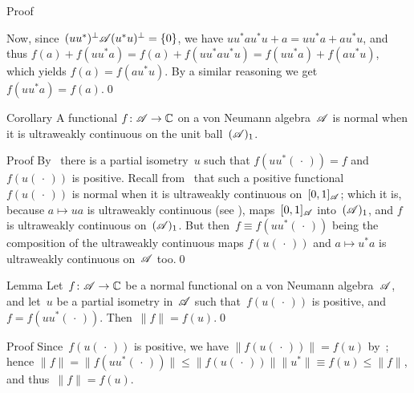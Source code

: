 \documentclass[a]{subfiles}
\begin{document}
\begin{parsec}
\begin{point}
\begin{point}{Proof}
\begin{point}
Now, since~$(uu^*)^\perp\mathscr{A}(u^*u)^\perp = \{0\}$,
we have $uu^* a u^*u + a = uu^*a + au^*u$,
and thus $f(a)+f(uu^*a)=f(a)+f(uu^*au^*u)=f(uu^*a)+f(au^*u)$,
which yields $f(a)=f(au^*u)$.
By a similar reasoning we get $f(uu^*a)=f(a)$.\qed
\end{point}
\end{point}
\end{point}
\begin{point}{Corollary}%
A functional $f\colon \mathscr{A}\to\mathbb{C}$
on a von Neumann algebra~$\mathscr{A}$
is normal
when it is ultraweakly continuous
on the unit ball~$(\mathscr{A})_1$.
\begin{point}{Proof}%
By~
there is a partial isometry~$u$
such that $f(uu^*(\,\cdot\,))=f$
and~$f(u(\,\cdot\,))$ is positive.
Recall from~ that such a positive functional~$f(u(\,\cdot\,))$
is normal when it is ultraweakly continuous
on~$[0,1]_{\mathscr{A}}$;
which it is, 
because $a\mapsto ua$ is ultraweakly continuous (see ),
maps~$[0,1]_{\mathscr{A}}$ into~$(\mathscr{A})_1$,
and $f$ is ultraweakly continuous on~$(\mathscr{A})_1$.
But then~$f\equiv f(uu^*(\,\cdot\,))$
being the composition of the ultraweakly continuous maps
$f(u(\,\cdot\,))$ and $a\mapsto u^*a$ 
is ultraweakly continuous on~$\mathscr{A}$ too.\qed
\end{point}
\end{point}
\begin{point}{Lemma}%
Let~$f\colon \mathscr{A}\to\mathbb{C}$
be a normal functional
on a von Neumann algebra~$\mathscr{A}$,
and let~$u$ be a partial isometry in~$\mathscr{A}$
such that~$f(u(\,\cdot\,))$ is positive,
and $f=f(uu^*(\,\cdot\,))$.
Then~$\|f\|=f(u)$.\qed
\begin{point}{Proof}%
Since~$f(u(\,\cdot\,))$ is positive,
we have $\|f(u(\,\cdot\,))\|=f(u)$
by~;
hence $\|f\|=\|f(uu^*(\,\cdot\,))\|
\leq \|f(u(\,\cdot\,))\|\|u^*\|
\equiv f(u) \leq \|f\|$,
and thus~$\|f\|=f(u)$.


\end{point}
\end{point}
\end{parsec}
\end{document}
